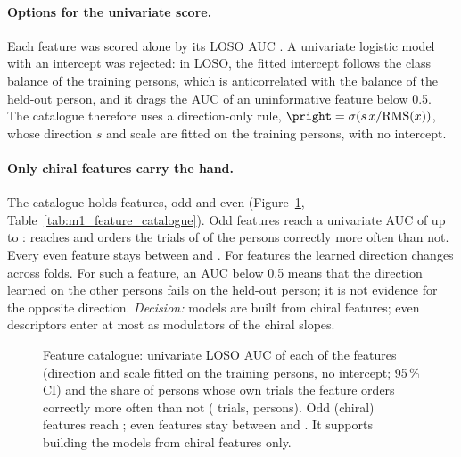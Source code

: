 \paragraph{Options for the univariate score.} Each feature was scored alone by its LOSO AUC
\cite{hanley1982roc}. A univariate logistic model with an intercept was rejected: in
LOSO, the fitted intercept follows the class balance of the training persons, which is anticorrelated
with the balance of the held-out person, and it drags the AUC of an uninformative feature below 0.5.
The catalogue therefore uses a direction-only rule, $\pright = \sigma(s\,x/\mathrm{RMS}(x))$, whose
direction $s$ and scale are fitted on the training persons, with no intercept.

\paragraph{Only chiral features carry the hand.} The catalogue holds  features,
 odd and  even (Figure~\ref{fig:M1_01_feature_catalogue},
Table~\ref{tab:m1_feature_catalogue}). Odd features reach a univariate AUC of up to
:  reaches  and orders the trials
of  of the persons correctly more often than not. Every even feature stays
between  and . For 
features the learned direction changes across folds. For such a feature, an AUC below 0.5 means that
the direction learned on the other persons fails on the held-out person; it is not evidence for the
opposite direction. \emph{Decision:} models are built from chiral features; even descriptors enter at
most as modulators of the chiral slopes.

\begin{figure}[p]
  \centering
  \caption{Feature catalogue: univariate LOSO AUC of each of the  features
  (direction and scale fitted on the training persons, no intercept; 95\,\% CI) and the share of
  persons whose own trials the feature orders correctly more often than not ( trials,
   persons). Odd (chiral) features reach ; even features stay
  between  and . It supports building the models from
  chiral features only.}
  \label{fig:M1_01_feature_catalogue}
\end{figure}

